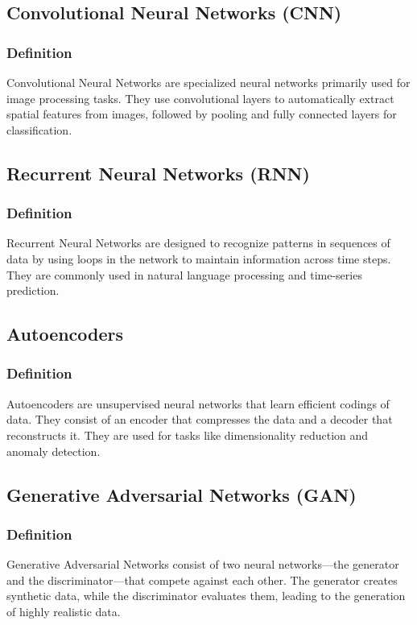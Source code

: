 \subsection{Convolutional Neural Networks (CNN)}
\subsubsection{Definition}
Convolutional Neural Networks are specialized neural networks primarily used for image processing tasks. They use convolutional layers to automatically extract spatial features from images, followed by pooling and fully connected layers for classification.

\subsection{Recurrent Neural Networks (RNN)}
\subsubsection{Definition}
Recurrent Neural Networks are designed to recognize patterns in sequences of data by using loops in the network to maintain information across time steps. They are commonly used in natural language processing and time-series prediction.



\subsection{Autoencoders}
\subsubsection{Definition}
Autoencoders are unsupervised neural networks that learn efficient codings of data. They consist of an encoder that compresses the data and a decoder that reconstructs it. They are used for tasks like dimensionality reduction and anomaly detection.

\subsection{Generative Adversarial Networks (GAN)}
\subsubsection{Definition}
Generative Adversarial Networks consist of two neural networks—the generator and the discriminator—that compete against each other. The generator creates synthetic data, while the discriminator evaluates them, leading to the generation of highly realistic data.
